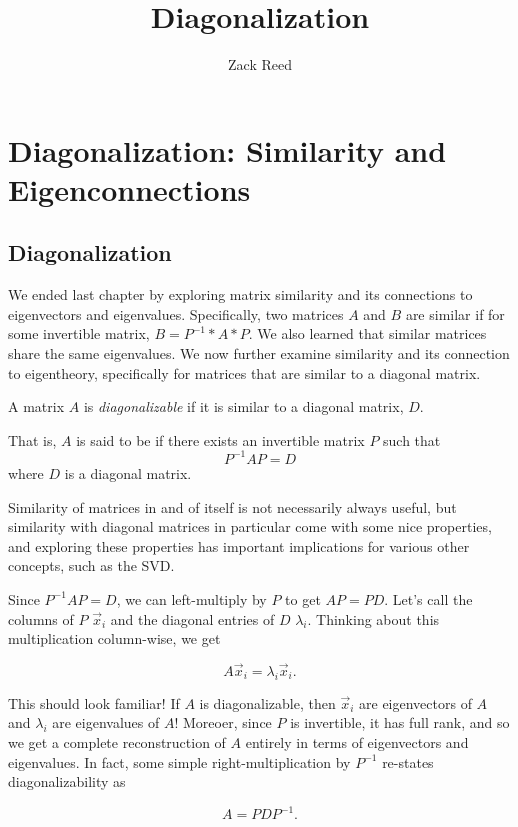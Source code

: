 \documentclass{ximera}
\author{Zack Reed}
\title{Diagonalization}
\begin{document}
\begin{abstract}

\end{abstract}
\maketitle

\section*{Diagonalization: Similarity and Eigenconnections}

\subsection*{Diagonalization}

We ended last chapter by exploring matrix similarity and its connections to eigenvectors and eigenvalues. Specifically, two matrices $A$ and $B$ are similar if for some invertible matrix, $B=P^{-1}*A*P$. We also learned that similar matrices share the same eigenvalues. We now further examine similarity and its connection to eigentheory, specifically for matrices that are similar to a diagonal matrix. 

\begin{definition}
  A matrix $A$ is \emph{diagonalizable} if it is similar to a diagonal matrix, $D$. 

  That is, $A$ is said to be  if there exists an invertible matrix $P$ such that
\begin{equation*}
P^{-1}AP=D
\end{equation*}
where $D$ is a diagonal matrix.
\end{definition}

Similarity of matrices in and of itself is not necessarily always useful, but similarity with diagonal matrices in particular come with some nice properties, and exploring these properties has important implications for various other concepts, such as the SVD.

\begin{exploration}

    Since $P^{-1}AP=D$, we can left-multiply by $P$ to get $AP=PD$. Let's call the columns of $P$ $\vec{x}_i$ and the diagonal entries of $D$ $\lambda_i$. Thinking about this multiplication column-wise, we get

    $$A\vec{x}_i=\lambda_i\vec{x}_i.$$

    This should look familiar! If $A$ is diagonalizable, then $\vec{x}_i$ are eigenvectors of $A$ and $\lambda_i$ are eigenvalues of $A$! Moreoer, since $P$ is invertible, it has full rank, and so we get a complete reconstruction of $A$ entirely in terms of eigenvectors and eigenvalues. In fact, some simple right-multiplication by $P^{-1}$ re-states diagonalizability as

    $$A=PDP^{-1}.$$


\end{exploration}
\end{document}
